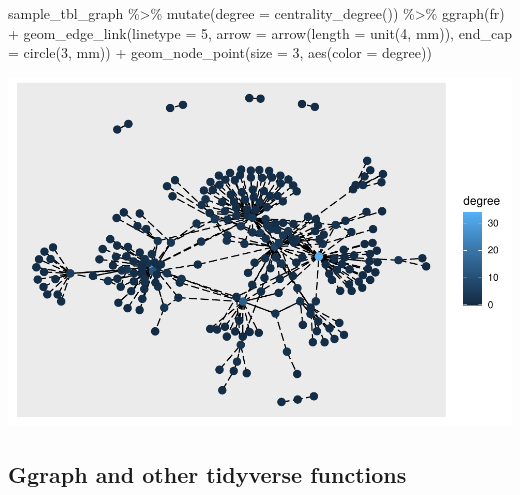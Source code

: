\documentclass[
]{book}
\newenvironment{Shaded}{\begin{snugshade}}{\end{snugshade}}
\newcommand{\AttributeTok}[1]{\textcolor[rgb]{0.77,0.63,0.00}{#1}}
\newcommand{\DecValTok}[1]{\textcolor[rgb]{0.00,0.00,0.81}{#1}}
\newcommand{\FunctionTok}[1]{\textcolor[rgb]{0.00,0.00,0.00}{#1}}
\newcommand{\NormalTok}[1]{#1}
\newcommand{\SpecialCharTok}[1]{\textcolor[rgb]{0.00,0.00,0.00}{#1}}
\newcommand{\StringTok}[1]{\textcolor[rgb]{0.31,0.60,0.02}{#1}}
\begin{document}
\begin{Shaded}
\begin{Highlighting}[]
\NormalTok{sample\_tbl\_graph }\SpecialCharTok{\%\textgreater{}\%} 
  \FunctionTok{mutate}\NormalTok{(}\AttributeTok{degree =} \FunctionTok{centrality\_degree}\NormalTok{()) }\SpecialCharTok{\%\textgreater{}\%} 
  \FunctionTok{ggraph}\NormalTok{(}\StringTok{\textquotesingle{}fr\textquotesingle{}}\NormalTok{) }\SpecialCharTok{+} 
  \FunctionTok{geom\_edge\_link}\NormalTok{(}\AttributeTok{linetype =} \DecValTok{5}\NormalTok{,}
                 \AttributeTok{arrow =} \FunctionTok{arrow}\NormalTok{(}\AttributeTok{length =} \FunctionTok{unit}\NormalTok{(}\DecValTok{4}\NormalTok{, }\StringTok{\textquotesingle{}mm\textquotesingle{}}\NormalTok{)), }
                   \AttributeTok{end\_cap =} \FunctionTok{circle}\NormalTok{(}\DecValTok{3}\NormalTok{, }\StringTok{\textquotesingle{}mm\textquotesingle{}}\NormalTok{)) }\SpecialCharTok{+} 
  \FunctionTok{geom\_node\_point}\NormalTok{(}\AttributeTok{size =} \DecValTok{3}\NormalTok{, }\FunctionTok{aes}\NormalTok{(}\AttributeTok{color =}\NormalTok{ degree))}
\end{Highlighting}
\end{Shaded}

\includegraphics{_main_files/figure-latex/unnamed-chunk-62-1.pdf}

\hypertarget{ggraph-and-other-tidyverse-functions}{%
\subsection{Ggraph and other tidyverse functions}\label{ggraph-and-other-tidyverse-functions}}
\end{document}
